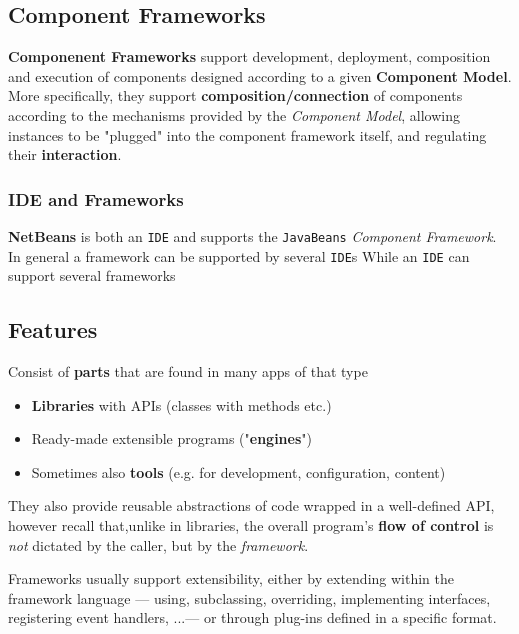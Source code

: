 \subsection{Component Frameworks}
\textbf{Componenent Frameworks} support development, deployment, composition
and execution of components designed according to a given
\textbf{Component Model}.
More specifically, they support \textbf{composition/connection} of components according to
the mechanisms provided by the \textit{Component Model},
allowing instances to be "plugged" into the
component framework itself,
and regulating their \textbf{interaction}.

\subsubsection{IDE and Frameworks}
\textbf{NetBeans} is both an \texttt{IDE} and supports the \texttt{JavaBeans} \textit{Component Framework}.\\
In general a framework can be supported by several \texttt{IDE}s
While an \texttt{IDE} can support several frameworks

\subsection{Features}
Consist of \textbf{parts} that are found in many apps of that type
\begin{itemize}
   \item \textbf{Libraries} with APIs (classes with methods etc.)
   \item Ready-made extensible programs ("\textbf{engines}")
   \item Sometimes also \textbf{tools} (e.g. for development, configuration,
   content)
\end{itemize}
They also provide reusable abstractions of code wrapped in a well-defined API,
however recall that,unlike in libraries,
the overall program's \textbf{flow of control} is \textit{not} dictated by the caller, but by the \textit{framework}.
\nl

Frameworks usually support extensibility,
either by extending within the framework language {---} using, subclassing, overriding, implementing interfaces, registering event handlers, ...{---} or through plug-ins defined in a specific format.
 

